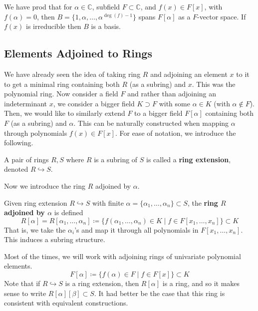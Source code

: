   We have prod that for $\alpha \in \mathbb{C}$, subfield $F \subset \mathbb{C}$, and $f(x) \in F[x]$, with $f(\alpha) = 0$, then $B = \{1, \alpha, \ldots, \alpha^{\deg(f) - 1}\}$ spans $F[\alpha]$ as a $F$-vector space. If $f(x)$ is irreducible then $B$ is a basis. 

\subsection{Elements Adjoined to Rings} 

  We have already seen the idea of taking ring $R$ and adjoining an element $x$ to it to get a minimal ring containing both $R$ (as a subring) and $x$. This was the polynomial ring. Now consider a field $F$ and rather than adjoining an indeterminant $x$, we consider a bigger field $K \supset F$ with some $\alpha \in K$ (with $\alpha \not\in F$). Then, we would like to similarly extend $F$ to a bigger field $F[\alpha]$ containing both $F$ (as a subring) and $\alpha$. This can be naturally constructed when mapping $\alpha$ through polynomials $f(x) \in F[x]$. For ease of notation, we introduce the following. 

  \begin{definition}
    A pair of rings $R, S$ where $R$ is a subring of $S$ is called a \textbf{ring extension}, denoted $R \hookrightarrow S$. 
  \end{definition}

  Now we introduce the ring $R$ adjoined by $\alpha$. 
  
  \begin{definition} 
    Given ring extension $R \hookrightarrow S$ with finite $\alpha = \{\alpha_1, \ldots, \alpha_n\} \subset S$, the \textbf{ring $R$ adjoined by $\alpha$} is defined 
    \begin{equation}
      R[\alpha] = R[\alpha_1, \ldots, \alpha_n] \coloneqq \{ f(\alpha_1, \ldots, \alpha_n) \in K \mid f \in F[x_1, \ldots, x_n]\} \subset K
    \end{equation} 
    That is, we take the $\alpha_i$'s and map it through all polynomials in $F[x_1, \ldots, x_n]$. This induces a subring structure. 
  \end{definition} 

  Most of the times, we will work with adjoining rings of univariate polynomial elements. 
  \begin{equation}
    F[\alpha] \coloneqq \{ f(\alpha) \in F \mid f \in F[x]\} \subset K
  \end{equation} 
  Note that if $R \hookrightarrow S$ is a ring extension, then $R[\alpha]$ is a ring, and so it makes sense to write $R[\alpha][\beta] \subset S$. It had better be the case that this ring is consistent with equivalent constructions. 

